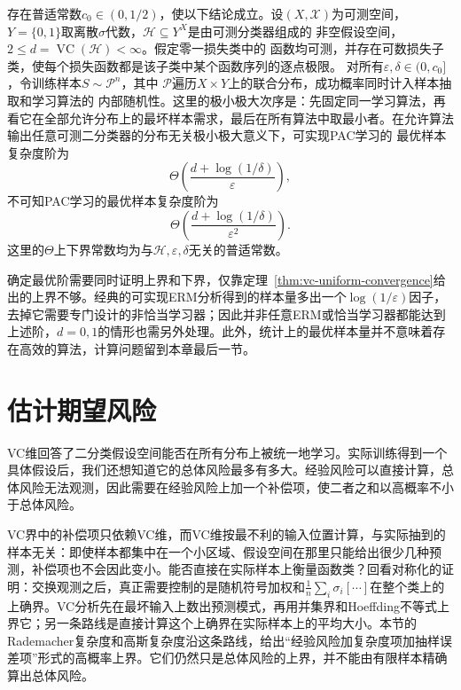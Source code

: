 \begin{theorem}[二分类的最优样本复杂度阶]
\label{thm:binary-optimal-sample-complexity}
存在普适常数$c_0\in(0,1/2)$，使以下结论成立。设$(X,\mathcal X)$为可测空间，
$Y=\{0,1\}$取离散$\sigma$代数，$\mathcal H\subseteq Y^X$是由可测分类器组成的
非空假设空间，$2\leq d=\operatorname{VC}(\mathcal H)<\infty$。假定零一损失类中的
函数均可测，并存在可数损失子类，使每个损失函数都是该子类中某个函数序列的逐点极限。
对所有$\varepsilon,\delta\in(0,c_0]$，令训练样本$S\sim\mathcal P^n$，其中
$\mathcal P$遍历$X\times Y$上的联合分布，成功概率同时计入样本抽取和学习算法的
内部随机性。这里的极小极大次序是：先固定同一学习算法，再看它在全部允许分布上的最坏样本需求，最后在所有算法中取最小者。在允许算法输出任意可测二分类器的分布无关极小极大意义下，可实现PAC学习的
最优样本复杂度阶为
\[
 \Theta\left(\frac{d+\log(1/\delta)}{\varepsilon}\right),
\]
不可知PAC学习的最优样本复杂度阶为
\[
 \Theta\left(\frac{d+\log(1/\delta)}{\varepsilon^2}\right).
\]
这里的$\Theta$上下界常数均为与$\mathcal H,\varepsilon,\delta$无关的普适常数。
\end{theorem}

确定最优阶需要同时证明上界和下界，仅靠定理~\ref{thm:vc-uniform-convergence}给出的上界不够。经典的可实现ERM分析得到的样本量多出一个$\log(1/\varepsilon)$因子，去掉它需要专门设计的非恰当学习器；因此并非任意ERM或恰当学习器都能达到上述阶，$d=0,1$的情形也需另外处理。此外，统计上的最优样本量并不意味着存在高效的算法，计算问题留到本章最后一节。

\section{估计期望风险}
\label{sec:rademacher-complexity}

VC维回答了二分类假设空间能否在所有分布上被统一地学习。实际训练得到一个具体假设后，我们还想知道它的总体风险最多有多大。经验风险可以直接计算，总体风险无法观测，因此需要在经验风险上加一个补偿项，使二者之和以高概率不小于总体风险。

VC界中的补偿项只依赖VC维，而VC维按最不利的输入位置计算，与实际抽到的样本无关：即使样本都集中在一个小区域、假设空间在那里只能给出很少几种预测，补偿项也不会因此变小。能否直接在实际样本上衡量函数类？回看对称化的证明：交换观测之后，真正需要控制的是随机符号加权和$\frac1n\sum_i\sigma_i[\cdots]$在整个类上的上确界。VC分析先在最坏输入上数出预测模式，再用并集界和Hoeffding不等式上界它；另一条路线是直接计算这个上确界在实际样本上的平均大小。本节的Rademacher复杂度和高斯复杂度沿这条路线，给出“经验风险加复杂度项加抽样误差项”形式的高概率上界。它们仍然只是总体风险的上界，并不能由有限样本精确算出总体风险。

